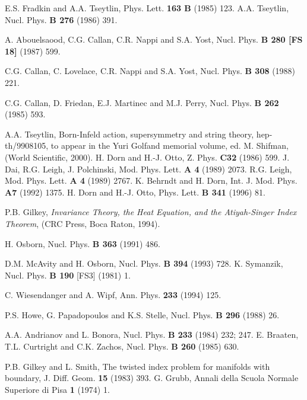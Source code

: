 \documentclass[a4paper,12pt]{article}
\begin{document}


\begin{thebibliography}{99}

E.S. Fradkin and A.A. Tseytlin, 
Phys. Lett. \textbf{163 B} (1985) 123. 
 A.A. Tseytlin, Nucl. Phys. \textbf{B 276} (1986) 391.

 A. Abouelsaood, C.G. Callan, C.R. Nappi and S.A. Yost, 
Nucl. Phys. \textbf{B
280 {[}FS 18{]}} (1987) 599.

C.G. Callan, C. Lovelace, C.R. Nappi and S.A. Yost,
Nucl. Phys. {\bf B 308} (1988) 221.

C.G. Callan, D. Friedan, E.J. Martinec and M.J. Perry, 
Nucl. Phys. \textbf{B 262} (1985) 593. 

A.A. Tseytlin, Born-Infeld action, 
supersymmetry and string theory, hep-th/9908105,
to appear in the Yuri Golfand memorial volume, ed. M. Shifman, 
(World Scientific,
2000).
H. Dorn and H.-J. Otto, Z. Phys. {\bf C32} (1986) 599.
J. Dai, R.G. Leigh, J. Polchinski, Mod. Phys. Lett. {\bf A 4}
(1989) 2073.
R.G. Leigh, Mod. Phys. Lett. {\bf A 4} (1989) 2767.
K. Behrndt and H. Dorn, Int. J. Mod. Phys. {\bf A7}
(1992) 1375.
H. Dorn and H.-J. Otto, Phys. Lett. {\bf B 341} (1996) 81.

 P.B. Gilkey, 
\textit{Invariance Theory, the Heat Equation, and the Atiyah-Singer
Index Theorem}, (CRC Press, Boca Raton, 1994).

H. Osborn, Nucl. Phys. {\bf B 363} (1991) 486.

D.M. McAvity and H. Osborn, Nucl. Phys. {\bf B 394} (1993) 728.
K. Symanzik, Nucl. Phys. {\bf B 190} [FS3] (1981) 1.

C. Wiesendanger and A. Wipf, Ann. Phys. {\bf 233} (1994)
125.

 P.S. Howe, G. Papadopoulos and K.S. Stelle,
Nucl. Phys. {\bf B 296} (1988) 26.


A.A. Andrianov and L. Bonora, 
Nucl. Phys. \textbf{B 233} (1984) 232; 247.
E. Braaten, T.L. Curtright and C.K. Zachos,
Nucl. Phys. {\bf B 260} (1985) 630.


 P.B. Gilkey and L. Smith, 
The twisted index problem for manifolds with boundary,
J. Diff. Geom. 
\textbf{15} (1983) 393.
G. Grubb, Annali della Scuola Normale Superiore di Pisa
{\bf 1} (1974) 1.


\end{thebibliography}
\end{document}
